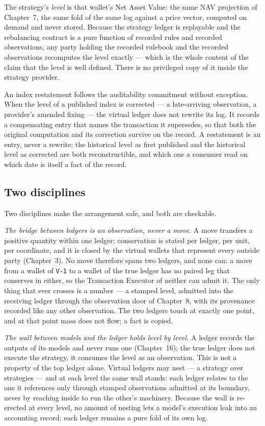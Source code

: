 \documentclass[11pt,a4paper]{article}
\begin{document}
The strategy's \emph{level} is that wallet's Net Asset Value: the same NAV
projection of Chapter~7, the same fold of the same log against a price vector,
computed on demand and never stored. Because the strategy ledger is replayable
and the rebalancing contract is a pure function of recorded rules and recorded
observations, any party holding the recorded rulebook and the recorded
observations recomputes the level exactly --- which is the whole content of the
claim that the level is well defined. There is no privileged copy of it inside
the strategy provider.

An index restatement follows the auditability commitment without exception. When
the level of a published index is corrected --- a late-arriving observation, a
provider's amended fixing --- the virtual ledger does not rewrite its log. It
records a compensating entry that names the transaction it supersedes, so that
both the original computation and its correction survive on the record. A
restatement is an entry, never a rewrite; the historical level as first published
and the historical level as corrected are both reconstructible, and which one a
consumer read on which date is itself a fact of the record.

\subsection{Two disciplines}

Two disciplines make the arrangement safe, and both are checkable.

\emph{The bridge between ledgers is an observation, never a move.} A move
transfers a positive quantity within one ledger; conservation is stated per
ledger, per unit, per coordinate, and it is closed by the virtual wallets that
represent every outside party (Chapter~3). No move therefore spans two ledgers,
and none can: a move from a wallet of \texttt{V-1} to a wallet of the true ledger
has no paired leg that conserves in either, so the Transaction Executor of
neither can admit it. The only thing that ever crosses is a number --- a stamped
level, admitted into the receiving ledger through the observation door of
Chapter~8, with its provenance recorded like any other observation. The two
ledgers touch at exactly one point, and at that point mass does not flow; a fact
is copied.

\emph{The wall between models and the ledger holds level by level.} A ledger
records the outputs of its models and never runs one (Chapter~16); the true
ledger does not execute the strategy, it consumes the level as an observation.
This is not a property of the top ledger alone. Virtual ledgers may nest --- a
strategy over strategies --- and at each level the same wall stands: each ledger
relates to the one it references only through stamped observations admitted at
its boundary, never by reaching inside to run the other's machinery. Because the
wall is re-erected at every level, no amount of nesting lets a model's execution
leak into an accounting record; each ledger remains a pure fold of its own log.
\end{document}
